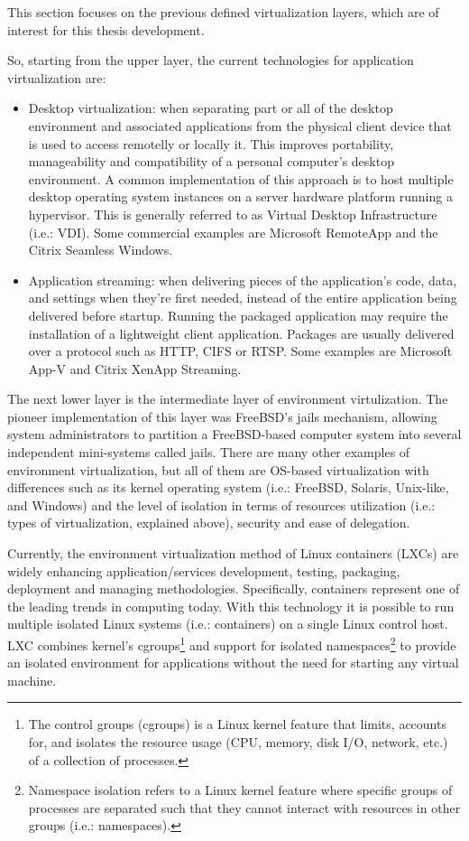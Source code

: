 This section focuses on the previous defined virtualization layers, which are of interest for this thesis development.

So, starting from the upper layer, the current technologies for application virtualization are:

\begin{itemize}
\item Desktop virtualization: when separating part or all of the desktop environment and associated applications from the physical client device that is used to access remotelly or locally it. This improves portability, manageability and compatibility of a personal computer's desktop environment. A common implementation of this approach is to host multiple desktop operating system instances on a server hardware platform running a hypervisor. This is generally referred to as Virtual Desktop Infrastructure (i.e.: VDI). Some commercial examples are Microsoft RemoteApp and the Citrix Seamless Windows. 
\item Application streaming: when delivering pieces of the application's code, data, and settings when they're first needed, instead of the entire application being delivered before startup. Running the packaged application may require the installation of a lightweight client application. Packages are usually delivered over a protocol such as HTTP, CIFS or RTSP. Some examples are Microsoft App-V and Citrix XenApp Streaming.
\end{itemize}

The next lower layer is the intermediate layer of environment virtulization. The pioneer implementation of this layer was FreeBSD's jails mechanism, allowing system administrators to partition a FreeBSD-based computer system into several independent mini-systems called jails. There are many other examples of environment virtualization, but all of them are OS-based virtualization with differences such as its kernel operating system (i.e.: FreeBSD, Solaris, Unix-like, and Windows) and the level of isolation in terms of resources utilization (i.e.: types of virtualization, explained above), security and ease of delegation. 

Currently, the environment virtualization method of Linux containers (LXCs) are widely enhancing application/services development, testing, packaging, deployment and managing methodologies. Specifically, containers represent one of the leading trends in computing today. With this technology it is possible to run multiple isolated Linux systems (i.e.: containers) on a single Linux control host. LXC combines kernel's cgroups\footnote{The control groups (cgroups) is a Linux kernel feature that limits, accounts for, and isolates the resource usage (CPU, memory, disk I/O, network, etc.) of a collection of processes.} and support for isolated namespaces\footnote{Namespace isolation refers to a Linux kernel feature where specific groups of processes are separated such that they cannot interact with resources in other groups (i.e.: namespaces).} to provide an isolated environment for applications without the need for starting any virtual machine.

